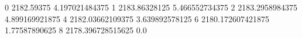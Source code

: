 0 2182.59375 4.197021484375
1 2183.86328125 5.466552734375
2 2183.2958984375 4.899169921875
4 2182.03662109375 3.639892578125
6 2180.172607421875 1.77587890625
8 2178.396728515625 0.0
